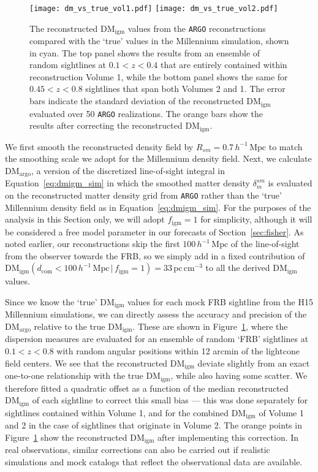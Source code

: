 \documentclass[twocolumn]{aastex63}
\newcommand{\dmigm}{\ensuremath{\mathrm{DM}_\mathrm{igm}}}
\newcommand{\dmargo}{\ensuremath{\mathrm{DM_{argo}}}}
\newcommand{\pccmcube}{\ensuremath{\mathrm{pc}\,\mathrm{cm}^{-3}}}
\newcommand{\figm}{\ensuremath{f_\mathrm{igm}}}
\newcommand{\hmpc}{\ensuremath{h^{-1}\,\mathrm{Mpc}}}
\newcommand{\argo}{\texttt{ARGO}}
\begin{document}
\begin{CJK*}{UTF8}{gbsn}
 \begin{figure}
\texttt{[image: dm\_vs\_true\_vol1.pdf]}
\texttt{[image: dm\_vs\_true\_vol2.pdf]}
\caption{\label{fig:dm_vs_true}
The reconstructed \dmigm{} values from the \argo{} reconstructions compared with the `true' values in the Millennium simulation, shown in cyan. The top panel shows the 
results from an ensemble of random sightlines at $0.1<z<0.4$ that are entirely contained within reconstruction Volume 1, while the bottom panel shows the same
for $0.45<z<0.8$ sightlines that span both Volumes 2 and 1. The error bars indicate the standard deviation of the reconstructed \dmigm{} evaluated over 50 \argo{}
realizations. The orange bars show the results after correcting the reconstructed \dmigm. }
\end{figure}

We first smooth the reconstructed density field by $R_{sm}=0.7\,\hmpc$ to match the
smoothing scale we adopt for the Millennium density field. Next, we calculate \dmargo{}, a version of the discretized line-of-sight integral in Equation~\ref{eq:dmigm_sim} in which the smoothed matter density $\delta^{sm}_{m}$ is evaluated on the reconstructed matter density grid from \argo{} rather than the `true' Millennium density field as in Equation~\ref{eq:dmigm_sim}. For the purposes of the analysis in this Section only, we will adopt $\figm=1$ for simplicity, although it will be considered a free model parameter in our forecasts of Section~\ref{sec:fisher}. As noted earlier, our reconstructions skip the first $100\,\hmpc$ of the line-of-sight from the observer towards the FRB,  so we simply add in a fixed contribution of $\dmigm( d_\mathrm{com}<100\,\hmpc\, | \, \figm = 1) = 33 \,\pccmcube$ to all the derived \dmigm{} values.

Since we know the `true' \dmigm{} values for each mock FRB sightline from the H15 Millennium simulations, we can directly assess the accuracy and precision
of the \dmargo{} relative to the true \dmigm{}. These are shown in Figure~\ref{fig:dm_vs_true}, where the dispersion measures are evaluated for
an ensemble of random `FRB' sightlines at $0.1<z<0.8$ with random angular positions within 12 arcmin of the lightcone field centers. We see that the reconstructed \dmigm{} deviate
slightly from an exact one-to-one relationship with the true \dmigm{}, while also having some scatter. We therefore fitted a quadratic offset as a function of
the median reconstructed \dmigm{} of each sightline to correct this small bias --- this was done separately for sightlines contained within Volume 1, 
and for the combined \dmigm{}  of Volume 1 and 2 in the case of sightlines that originate in Volume 2. The orange points in Figure~\ref{fig:dm_vs_true} 
show the reconstructed \dmigm{} after implementing this correction. 
In real observations, similar corrections can also be carried out if realistic simulations and mock catalogs
that reflect the observational data are available.


\end{CJK*}
\end{document}
